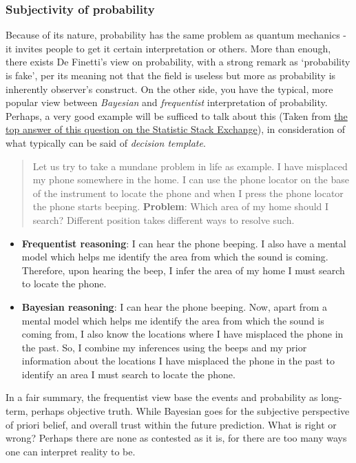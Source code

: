 \subsubsection{Subjectivity of probability}

Because of its nature, probability has the same problem as quantum mechanics - it invites people to get it certain interpretation or others. More than enough, there exists De Finetti's view on probability, with a strong remark as `probability is fake', per its meaning not that the field is useless but more as probability is inherently observer's construct. On the other side, you have the typical, more popular view between \textit{Bayesian} and \textit{frequentist} interpretation of probability. Perhaps, a very good example will be sufficed to talk about this (Taken from \href{https://stats.stackexchange.com/questions/22/bayesian-and-frequentist-reasoning-in-plain-english}{the top answer of this question on the Statistic Stack Exchange}), in consideration of what typically can be said of \textit{decision template}.
\begin{quote}
    Let us try to take a mundane problem in life as example. I have misplaced my phone somewhere in the home. I can use the phone locator on the base of the instrument to locate the phone and when I press the phone locator the phone starts beeping. \textbf{Problem}: Which area of my home should I search? Different position takes different ways to resolve such.
\end{quote}
\begin{itemize}[itemsep=1pt, topsep=1pt]
    \item \textbf{Frequentist reasoning}: I can hear the phone beeping. I also have a mental model which helps me identify the area from which the sound is coming. Therefore, upon hearing the beep, I infer the area of my home I must search to locate the phone.
    \item \textbf{Bayesian reasoning}: I can hear the phone beeping. Now, apart from a mental model which helps me identify the area from which the sound is coming from, I also know the locations where I have misplaced the phone in the past. So, I combine my inferences using the beeps and my prior information about the locations I have misplaced the phone in the past to identify an area I must search to locate the phone.
\end{itemize}
In a fair summary, the frequentist view base the events and probability as long-term, perhaps objective truth. While Bayesian goes for the subjective perspective of priori belief, and overall trust within the future prediction. What is right or wrong? Perhaps there are none as contested as it is, for there are too many ways one can interpret reality to be.  


